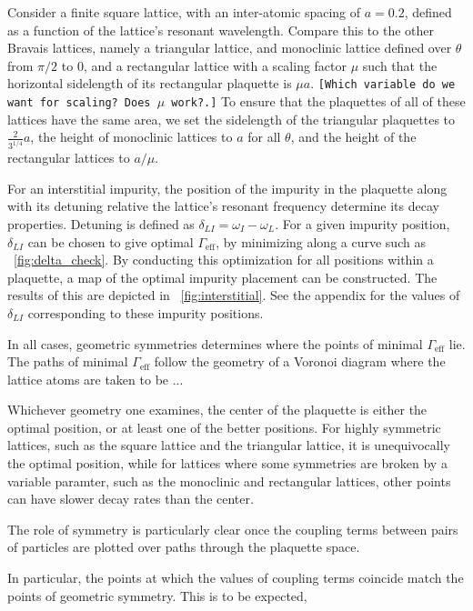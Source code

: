 \documentclass[aps,pra,superscriptaddress,twocolumn]{revtex4-1}
\newcommand{\fref}[1]{\text{Fig.}~\ref{#1}}
\newcommand{\commentSB}[1]{\texttt{\color{blue}[#1]}}
\begin{document}
Consider a finite square lattice, with an inter-atomic spacing of $a = 0.2$, defined as a function of the lattice's resonant wavelength. Compare this to the other Bravais lattices, namely a triangular lattice, and monoclinic lattice defined over $\theta$ from $\pi/2$ to $0$, and a rectangular lattice with a scaling factor $\mu$ such that the horizontal sidelength of its rectangular plaquette is $\mu a$. 
\commentSB{Which variable do we want for scaling? Does $\mu$ work?.} To ensure that the plaquettes of all of these lattices have the same area, we set the sidelength of the triangular plaquettes to $\frac{2}{3^{1/4}}a$, the height of monoclinic lattices to $a$ for all $\theta$, and the height of the rectangular lattices to $a/\mu$. 

For an interstitial impurity, the position of the impurity in the plaquette along with its detuning relative the lattice's resonant frequency determine its decay properties. Detuning is defined as $ \delta_{LI} = \omega_I - \omega_L$. For a given impurity position, $\delta_{LI}$ can be chosen to give optimal $\Gamma_\text{eff}$, by minimizing along a curve such as \fref{fig:delta_check}. By conducting this optimization for all positions within a plaquette, a map of the optimal impurity placement can be constructed. The results of this are depicted in \fref{fig:interstitial}. See the appendix for the values of $\delta_{LI}$ corresponding to these impurity positions. 

In all cases, geometric symmetries determines where the points of minimal $\Gamma_\text{eff}$ lie. The paths of minimal $\Gamma_\text{eff}$ follow the geometry of a Voronoi diagram where the lattice atoms are taken to be ... 



Whichever geometry one examines, the center of the plaquette is either the optimal position, or at least one of the better positions. For highly symmetric lattices, such as the square lattice and the triangular lattice, it is unequivocally the optimal position, while for lattices where some symmetries are broken by a variable paramter, such as the monoclinic and rectangular lattices, other points can have slower decay rates than the center. 

The role of symmetry is particularly clear once the coupling terms between pairs of particles are plotted over paths through the plaquette space. 

In particular, the points at which the values of coupling terms coincide match the points of geometric symmetry. This is to be expected, 
\end{document}
